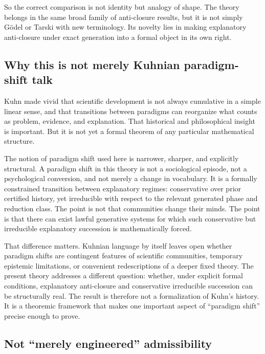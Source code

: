 \documentclass[11pt,a4paper]{article}
\theoremstyle{definition}
\begin{document}
So the correct comparison is not identity but analogy of shape. The theory belongs in the same broad family of anti-closure results, but it is not simply Gödel or Tarski with new terminology. Its novelty lies in making explanatory anti-closure under exact generation into a formal object in its own right.

\subsection{Why this is not merely Kuhnian paradigm-shift talk}\label{sec:not-kuhn}

Kuhn \cite{Kuhn1970} made vivid that scientific development is not always cumulative in a simple linear sense, and that transitions between paradigms can reorganize what counts as problem, evidence, and explanation. That historical and philosophical insight is important. But it is not yet a formal theorem of any particular mathematical structure.

The notion of paradigm shift used here is narrower, sharper, and explicitly structural. A paradigm shift in this theory is not a sociological episode, not a psychological conversion, and not merely a change in vocabulary. It is a formally constrained transition between explanatory regimes: conservative over prior certified history, yet irreducible with respect to the relevant generated phase and reduction class. The point is not that communities change their minds. The point is that there can exist lawful generative systems for which such conservative but irreducible explanatory succession is mathematically forced.

That difference matters. Kuhnian language by itself leaves open whether paradigm shifts are contingent features of scientific communities, temporary epistemic limitations, or convenient redescriptions of a deeper fixed theory. The present theory addresses a different question: whether, under explicit formal conditions, explanatory anti-closure and conservative irreducible succession can be structurally real. The result is therefore not a formalization of Kuhn's history. It is a theoremic framework that makes one important aspect of ``paradigm shift'' precise enough to prove.

\subsection{Not ``merely engineered'' admissibility}
\end{document}
